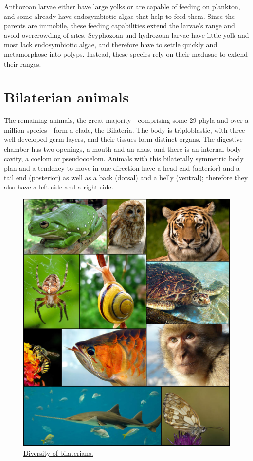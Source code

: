Anthozoan larvae either have large yolks or are capable of feeding on plankton, and some already have endosymbiotic algae that help to feed them. Since the parents are immobile, these feeding capabilities extend the larvae's range and avoid overcrowding of sites. Scyphozoan and hydrozoan larvae have little yolk and most lack endosymbiotic algae, and therefore have to settle quickly and metamorphose into polyps. Instead, these species rely on their medusae to extend their ranges.

\hypertarget{bilaterian-animals}{%
\section{Bilaterian animals}\label{bilaterian-animals}}

The remaining animals, the great majority---comprising some 29 phyla and over a million species---form a clade, the Bilateria. The body is triploblastic, with three well-developed germ layers, and their tissues form distinct organs. The digestive chamber has two openings, a mouth and an anus, and there is an internal body cavity, a coelom or pseudocoelom. Animals with this bilaterally symmetric body plan and a tendency to move in one direction have a head end (anterior) and a tail end (posterior) as well as a back (dorsal) and a belly (ventral); therefore they also have a left side and a right side.



\begin{figure}

{\centering \includegraphics[width=0.7\linewidth]{./figures/animals/Animal_diversity_October_2007} 

}

\caption{\href{https://commons.wikimedia.org/wiki/File:Animal_diversity_October_2007.jpg}{Diversity of bilaterians.}}\label{fig:bilateriandiversity}
\end{figure}

